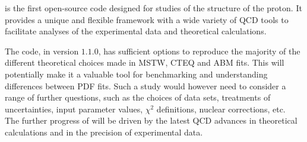 
\label{sec:summary}
\fitter is the first open-source code designed for studies of the structure of the proton.
It provides a unique and flexible framework with a wide variety of QCD tools to 
facilitate analyses of the experimental data and theoretical calculations. 

The \fitter code, in version $1.1.0$, has sufficient options to reproduce the majority of the different 
theoretical choices made in MSTW, CTEQ and ABM fits. This will potentially make it a  
valuable tool for benchmarking and understanding differences between PDF fits. 
Such a study would however need to consider a range of further questions, such as the choices of
data sets, treatments of uncertainties, input parameter values, $\chi^2$ definitions, nuclear corrections, etc. 
\\
The further progress of \fitter will be driven by the latest QCD advances in theoretical calculations 
and in the precision of experimental data.




